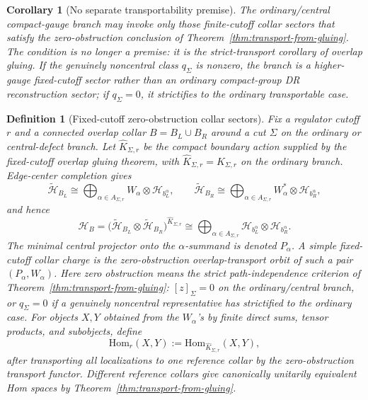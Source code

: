 \documentclass[11pt]{article}
\newtheorem{corollary}[theorem]{Corollary}
\newtheorem{definition}[theorem]{Definition}
\begin{document}
\begin{corollary}[No separate transportability premise]\label{cor:no-transportability-premise}
The ordinary/central compact-gauge branch may invoke only those finite-cutoff collar sectors that
satisfy the zero-obstruction conclusion of Theorem~\ref{thm:transport-from-gluing}. The condition
is no longer a premise: it is the strict-transport corollary of overlap gluing. If the genuinely
noncentral class \(q_\Sigma\) is nonzero, the branch is a higher-gauge fixed-cutoff sector rather
than an ordinary compact-group DR reconstruction sector; if \(q_\Sigma=0\), it strictifies to the
ordinary transportable case.
\end{corollary}

\begin{definition}[Fixed-cutoff zero-obstruction collar sectors]\label{def:fixed-cutoff-collar-sectors}
Fix a regulator cutoff \(r\) and a connected overlap collar \(B=B_L\cup B_R\) around a cut
\(\Sigma\) on the ordinary or central-defect branch. Let \(\widehat K_{\Sigma,r}\) be the compact
boundary action supplied by the fixed-cutoff overlap gluing theorem, with
\(\widehat K_{\Sigma,r}=K_{\Sigma,r}\) on the ordinary branch. Edge-center completion gives
\[
\widetilde{\mathcal H}_{B_L}
\cong
\bigoplus_{\alpha\in A_{\Sigma,r}}
W_\alpha\otimes \mathcal H_{b_L^\alpha},
\qquad
\widetilde{\mathcal H}_{B_R}
\cong
\bigoplus_{\alpha\in A_{\Sigma,r}}
W_\alpha^*\otimes \mathcal H_{b_R^\alpha},
\]
and hence
\[
\mathcal H_B
=
\bigl(\widetilde{\mathcal H}_{B_L}\otimes\widetilde{\mathcal H}_{B_R}\bigr)^{\widehat K_{\Sigma,r}}
\cong
\bigoplus_{\alpha\in A_{\Sigma,r}}
\mathcal H_{b_L^\alpha}\otimes \mathcal H_{b_R^\alpha}.
\]
The minimal central projector onto the \(\alpha\)-summand is denoted \(P_\alpha\). A simple
fixed-cutoff collar charge is the zero-obstruction overlap-transport orbit of such a pair
\((P_\alpha,W_\alpha)\). Here zero obstruction means the strict path-independence criterion of
Theorem~\ref{thm:transport-from-gluing}: \([z]_\Sigma=0\) on the ordinary/central branch, or
\(q_\Sigma=0\) if a genuinely noncentral representative has strictified to the ordinary case.
For objects \(X,Y\) obtained from the \(W_\alpha\)'s by finite direct sums, tensor products, and
subobjects, define
\[
\mathrm{Hom}_r(X,Y):=\mathrm{Hom}_{\widehat K_{\Sigma,r}}(X,Y),
\]
after transporting all localizations to one reference collar by the zero-obstruction transport
functor. Different reference collars give canonically unitarily equivalent Hom spaces by
Theorem~\ref{thm:transport-from-gluing}.
\end{definition}
\end{document}
